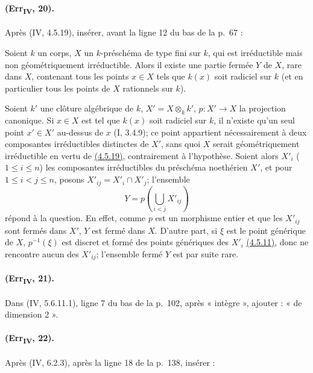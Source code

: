 \paragraph{(Err\textsubscript{IV}, 20).}
Après (IV, 4.5.19), insérer, avant la ligne 12 du bas de la p.~67 :

\begin{corollary}[4.5.19.3]
\label{IV.4.5.19.3}
Soient $k$ un corps, $X$ un $k$-préschéma de type fini sur $k$, qui est
irréductible mais non géométriquement irréductible. Alors il existe une
partie fermée $Y$ de $X$, rare dans $X$, contenant tous les points
$x\in X$ tels que $k(x)$ soit radiciel sur $k$ (et en particulier tous
les points de $X$ rationnels sur $k$).
\end{corollary}

Soient $k'$ une clôture algébrique de $k$, $X'=X\otimes_kk'$,
$p:X'\to X$ la projection canonique. Si $x\in X$ est tel que $k(x)$
soit radiciel sur $k$, il n'existe qu'un seul point $x'\in X'$ au-dessus
de $x$ (I, 3.4.9); ce point appartient nécessairement à deux composantes
irréductibles distinctes de $X'$, sans quoi $X$ serait géométriquement
irréductible en vertu de
{\hyperref[canon-index.ega4.c04.prop.4-5-19]{(4.5.19)}}, contrairement à
l'hypothèse. Soient alors $X'_i$ ($1\leq i\leq n$) les composantes
irréductibles du préschéma noethérien $X'$, et pour
$1\leq i<j\leq n$, posons $X'_{ij}=X'_i\cap X'_j$; l'ensemble
\[
 Y=p\left(\bigcup_{i<j}X'_{ij}\right)
\]
répond à la question. En effet, comme $p$ est un morphisme entier et
que les $X'_{ij}$ sont fermés dans $X'$, $Y$ est fermé dans $X$.
D'autre part, si $\xi$ est le point générique de $X$, $p^{-1}(\xi)$
est discret et formé des points génériques des $X'_i$
{\hyperref[canon-index.ega4.c04.cor.4-5-11]{(4.5.11)}}, donc ne rencontre aucun
des $X'_{ij}$; l'ensemble fermé $Y$ est par suite rare.

\paragraph{(Err\textsubscript{IV}, 21).}
Dans (IV, 5.6.11.1), ligne 7 du bas de la p.~102, après « intègre »,
ajouter : « de dimension 2 ».

\paragraph{(Err\textsubscript{IV}, 22).}
Après (IV, 6.2.3), après la ligne 18 de la p.~138, insérer :

